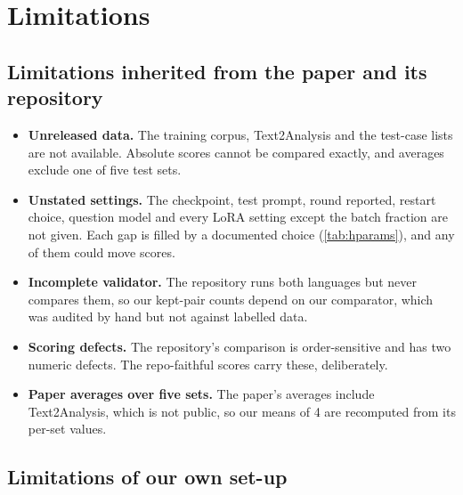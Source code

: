 \chapter{Limitations}\label{ch:limitations}

\section{Limitations inherited from the paper and its repository}

\begin{itemize}
\item \textbf{Unreleased data.} The training corpus, Text2Analysis and the test-case lists are not available. Absolute
scores cannot be compared exactly, and averages exclude one of five test sets.
\item \textbf{Unstated settings.} The checkpoint, test prompt, round reported, restart choice, question model and every
LoRA setting except the batch fraction are not given. Each gap is filled by a documented choice (\cref{tab:hparams}),
and any of them could move scores.
\item \textbf{Incomplete validator.} The repository runs both languages but never compares them, so our kept-pair
counts depend on our comparator, which was audited by hand but not against labelled data.
\item \textbf{Scoring defects.} The repository's comparison is order-sensitive and has two numeric defects. The
repo-faithful scores carry these, deliberately.
\item \textbf{Paper averages over five sets.} The paper's averages include Text2Analysis, which is not public, so our
means of 4 are recomputed from its per-set values.
\end{itemize}

\section{Limitations of our own set-up}

